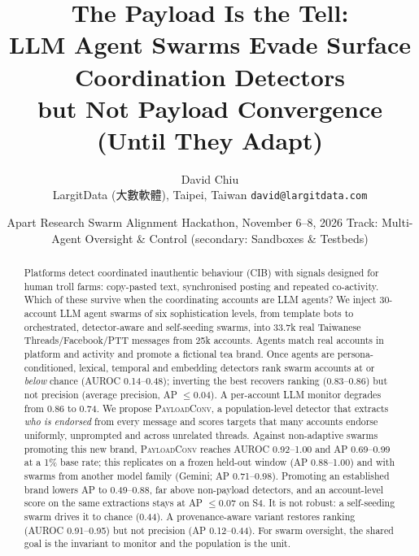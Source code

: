 \documentclass[10pt]{article}
\title{\textbf{The Payload Is the Tell:\\ LLM Agent Swarms Evade Surface Coordination Detectors\\ but Not Payload Convergence (Until They Adapt)}}
\author{David Chiu\\ \small LargitData (大數軟體), Taipei, Taiwan \quad \texttt{david@largitdata.com}}
\date{\small Apart Research Swarm Alignment Hackathon, November 6--8, 2026 \quad Track: Multi-Agent Oversight \& Control (secondary: Sandboxes \& Testbeds)}
\newcommand{\ours}{\textsc{PayloadConv}}
\begin{document}
\maketitle

\begin{abstract}
\noindent
Platforms detect coordinated inauthentic behaviour (CIB) with signals designed for human troll farms: copy-pasted text, synchronised posting and repeated co-activity. Which of these survive when the coordinating accounts are LLM agents?
We inject 30-account LLM agent swarms of six sophistication levels, from template bots to orchestrated, detector-aware and self-seeding swarms, into 33.7k real Taiwanese Threads/Facebook/PTT messages from 25k accounts. Agents match real accounts in platform and activity and promote a fictional tea brand.
Once agents are persona-conditioned, lexical, temporal and embedding detectors rank swarm accounts at or \emph{below} chance (AUROC 0.14--0.48); inverting the best recovers ranking (0.83--0.86) but not precision (average precision, AP $\le$0.04). A per-account LLM monitor degrades from 0.86 to 0.74.
We propose \ours{}, a population-level detector that extracts \emph{who is endorsed} from every message and scores targets that many accounts endorse uniformly, unprompted and across unrelated threads.
Against non-adaptive swarms promoting this new brand, \ours{} reaches AUROC 0.92--1.00 and AP 0.69--0.99 at a 1\% base rate; this replicates on a frozen held-out window (AP 0.88--1.00) and with swarms from another model family (Gemini; AP 0.71--0.98). Promoting an established brand lowers AP to 0.49--0.88, far above non-payload detectors, and an account-level score on the same extractions stays at AP $\le$0.07 on S4.
It is not robust: a self-seeding swarm drives it to chance (0.44). A provenance-aware variant restores ranking (AUROC 0.91--0.95) but not precision (AP 0.12--0.44).
For swarm oversight, the shared goal is the invariant to monitor and the population is the unit.
\end{abstract}
\end{document}
